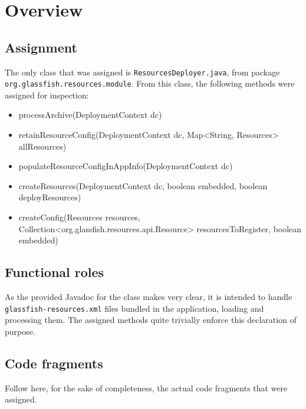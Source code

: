\chapter{Overview}

\section{Assignment}
The only class that was assigned is \texttt{ResourcesDeployer.java}, from package \texttt{org.glassfish.resources.module}. From this class, the following methods were assigned for inspection:
\begin{itemize}
\item\ttfamily processArchive(DeploymentContext dc)
\item\ttfamily retainResourceConfig(DeploymentContext dc, Map<String, Resources> allResources)
\item\ttfamily populateResourceConfigInAppInfo(DeploymentContext dc)
\item\ttfamily createResources(DeploymentContext dc, boolean embedded, boolean deployResources)
\item\ttfamily createConfig(Resources resources, Collection<org.\-glassfish.\-resources.\-api.\-Resource> resourcesToRegister, boolean embedded)
\end{itemize}

\section{Functional roles}
As the provided Javadoc for the class makes very clear, it is intended to handle \texttt{glassfish-resources.xml} files bundled in the application, loading and processing them. The assigned methods quite trivially enforce this declaration of purpose.

\section{Code fragments}
\label{sec:code}
Follow here, for the sake of completeness, the actual code fragments that were assigned.










